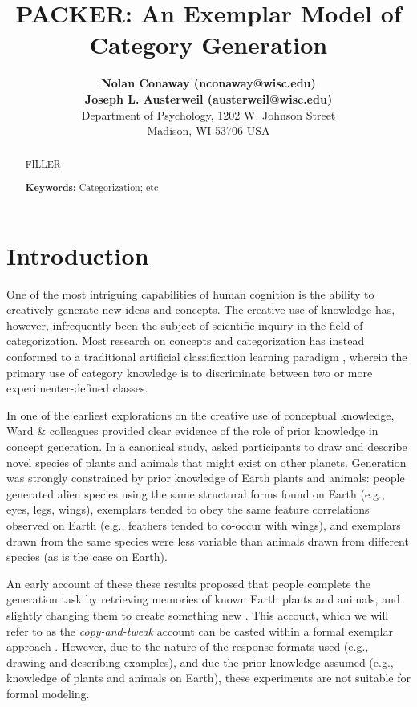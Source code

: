 \documentclass[10pt,letterpaper]{article}
\title{PACKER: An Exemplar Model of Category Generation}
\author{
{ \large \bf Nolan Conaway (nconaway@wisc.edu) } \\
{ \large \bf Joseph L. Austerweil (austerweil@wisc.edu) } \\
Department of Psychology, 1202 W. Johnson Street \\
Madison, WI 53706 USA
}
\begin{document}
\maketitle

\begin{abstract}
FILLER

\textbf{Keywords:} 
Categorization; etc
\end{abstract}

\section{Introduction}

One of the most intriguing capabilities of human cognition is the ability to creatively generate new ideas and concepts. %
The creative use of knowledge has, however, infrequently been the subject of scientific inquiry in the field of categorization. Most research on concepts and categorization has instead conformed to a traditional artificial classification learning paradigm \citep{kurtz2015human}, wherein the primary use of category knowledge is to discriminate between two or more experimenter-defined classes.

In one of the earliest explorations on the creative use of conceptual knowledge, Ward \& colleagues \citep{marsh1999inadvertent,smith1993constraining,ward2002role,ward1994structured,ward1995s} provided clear evidence of the role of prior knowledge in concept generation. In a canonical study, \citet{ward1994structured} asked participants to draw and describe novel species of plants and animals that might exist on other planets. Generation was strongly constrained by prior knowledge of Earth plants and animals: people generated alien species using the same structural forms found on Earth (e.g., eyes, legs, wings), exemplars tended to obey the same feature correlations observed on Earth (e.g., feathers tended to co-occur with wings), and exemplars drawn from the same species were less variable than animals drawn from different species (as is the case on Earth). 

An early account of these these results proposed that people complete the generation task by retrieving memories of known Earth plants and animals, and slightly changing them to create something new \citep{ward2002role,ward1995s}.  This account, which we will refer to as the \textit{copy-and-tweak} account can be casted within a formal exemplar approach \citep[see][]{jern2013probabilistic}. However, due to the nature of the response formats used (e.g., drawing and describing examples), and due the prior knowledge assumed (e.g., knowledge of plants and animals on Earth), these experiments are not suitable for formal modeling.
\end{document}
